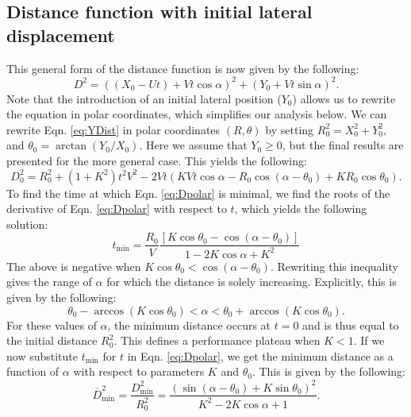 \documentclass[12pt]{article}
\def\ds{\displaystyle}
\newcommand{\ol}{\overline}
\begin{document}
\subsection{Distance function with initial lateral displacement}
This general form of the distance function is now given by the following:    
%
\begin{equation}
D^2 = ((X_0 - Ut) + Vt\cos\alpha)^2 + (Y_0 + Vt\sin\alpha)^2.
\label{eq:YDist}
\end{equation}
%
Note that the introduction of an initial lateral position ($Y_0$) allows us to rewrite the equation in polar coordinates, which simplifies our analysis below.
We can rewrite Eqn. \ref{eq:YDist} in polar coordinates $(R,\theta)$ by setting $R_0^2 = X_0^2 + Y_0^2,$ and $\theta_0 = \arctan(Y_0/X_0)$. 
Here we assume that $Y_0 \geq 0$, but the final results are presented for the more general case. 
This yields the following:
%
\begin{equation}
D_0^2 = R_0^2 + (1 + K^2) t^2 V^2 - 
 2 V t(K V t \cos \alpha  - R_0 \cos(\alpha - \theta_0) + K R_0 \cos \theta_0).
 \label{eq:Dpolar}
\end{equation}
%
To find the time at which Eqn. \ref{eq:Dpolar} is minimal, we find the roots of the derivative of Eqn. \ref{eq:Dpolar} with respect to $t$, which yields the following solution:
%
\begin{equation}
t_{\text{min}} = \ds \frac{R_0}{V} \frac{\left[K \cos \theta_0 - \cos(\alpha - \theta_0)\right ]}{1- 2K \cos \alpha + K^2}
\label{eq:tmin}
\end{equation}
%
The above is negative when $K \cos \theta_0 < \cos(\alpha - \theta_0).$ 
Rewriting this inequality gives the range of $\alpha$ for which the distance is solely increasing. Explicitly, this is given by the following:
%
\begin{equation}
\theta_0 - \arccos(K \cos \theta_0) < \alpha < \theta_0 + \arccos(K \cos \theta_0).
\label{eq:alphabound}
\end{equation}
%
For these values of $\alpha$, the minimum distance occurs at $t=0$ and is thus equal to the initial distance $R_0^2$. 
This defines a performance plateau when $K < 1.$
If we now substitute $t_{\text{min}}$ for $t$ in Eqn. \ref{eq:Dpolar}, we get the minimum distance as a function of $\alpha$ with respect to parameters $K$ and $\theta_0$. 
This is given by the following: 
%
\begin{equation}
\ol{D}^2_{\text{min}}= \ds\frac{{D}^2_{\text{min}}}{R_0^2 }=
\ds\frac{\left ( \sin(\alpha - \theta_0) + K \sin \theta_0 \right )^2}{K^2-2 K \cos \alpha +1}. 
\label{eq:Dmin_polar}
\end{equation}
%
\end{document}
